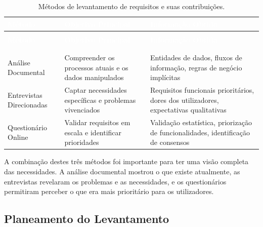 \begin{center}
{\small
{}
\begin{xltabular}{\textwidth}{|>{\raggedright\arraybackslash}p{3.5cm}|>{\raggedright\arraybackslash}X|>{\raggedright\arraybackslash}X|}
\hline
{}\textcolor{white}{\textbf{Método}} & \textcolor{white}{\textbf{Objetivo Principal}} & \textcolor{white}{\textbf{Informação Obtida}} \\ \hline
\endfirsthead

 \\
\hline
{}\textcolor{white}{\textbf{Método}} & \textcolor{white}{\textbf{Objetivo Principal}} & \textcolor{white}{\textbf{Informação Obtida}} \\ \hline
\endhead

\hline {} \\ \hline \endfoot

\hline
\caption{Métodos de levantamento de requisitos e suas contribuições.}
\label{tab:metodos-levantamento} \\
\endlastfoot

Análise Documental & Compreender os processos atuais e os dados manipulados & Entidades de dados, fluxos de informação, regras de negócio implícitas \\ \hline
Entrevistas Direcionadas & Captar necessidades específicas e problemas vivenciados & Requisitos funcionais prioritários, dores dos utilizadores, expectativas qualitativas \\ \hline
Questionário Online & Validar requisitos em escala e identificar prioridades & Validação estatística, priorização de funcionalidades, identificação de consensos \\ \hline
\end{xltabular}
}
\end{center}

A combinação destes três métodos foi importante para ter uma visão completa das necessidades. A análise documental mostrou o que existe atualmente, as entrevistas revelaram os problemas e as necessidades, e os questionários permitiram perceber o que era mais prioritário para os utilizadores.


\subsection{Planeamento do Levantamento}

